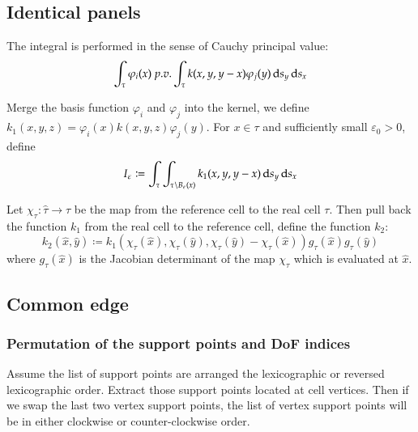 \documentclass[11pt, a4paper]{article}
\begin{document}
\subsection{Identical panels}

The integral is performed in the sense of Cauchy principal value:
\begin{equation}
  \int_{\tau} \varphi_i(x) \; p.v.\int_{\tau}k(x,y,y-x) \varphi_j(y) \,\mathrm{d} s_y \,\mathrm{d} s_x
\end{equation}

Merge the basis function $\varphi_i$ and $\varphi_j$ into the kernel, we define
$k_1(x,y,z)=\varphi_i(x)k(x,y,z)\varphi_j(y)$. For $x\in\tau$ and sufficiently small
$\varepsilon_0>0$, define
\begin{equation}
  I_{\varepsilon}\coloneqq \int_{\tau}\int_{\tau\backslash B_{\varepsilon}(x)} k_1(x,y,y-x) \,\mathrm{d}
  s_y \,\mathrm{d} s_x
\end{equation}

Let $\chi_{\tau}: \hat{\tau} \rightarrow \tau$ be the map from the reference cell to the real cell
$\tau$. Then pull back the function $k_1$ from the real cell to the reference cell, define the
function $k_2$:
\begin{equation}
  k_2(\hat{x}, \hat{y}) \coloneqq k_1(\chi_{\tau}(\hat{x}), \chi_{\tau}(\hat{y}), \chi_{\tau}(\hat{y})
  - \chi_{\tau}(\hat{x})) g_{\tau}(\hat{x}) g_{\tau}(\hat{y})
\end{equation}
where $g_{\tau}(\hat{x})$ is the Jacobian determinant of the map $\chi_{\tau}$ which is evaluated at
$\hat{x}$.

\subsection{Common edge}

\subsubsection{Permutation of the support points and DoF indices}


Assume the list of support points are arranged the lexicographic or reversed lexicographic order.
Extract those support points located at cell vertices. Then if we swap the last two vertex support
points, the list of vertex support points will be in either clockwise or counter-clockwise order.

\end{document}
